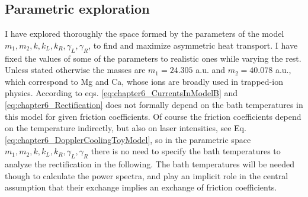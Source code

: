\subsection{Parametric exploration}
%
%
%
I have explored thoroughly the space formed by the parameters of the model $m_1,m_2,k,k_L,k_R,\gamma_L,\gamma_R$, to find
and maximize asymmetric heat transport. I have fixed the values of some of the parameters to realistic ones while varying the rest. Unless stated otherwise the masses are
$m_1 = 24.305$ a.u. and $m_2 = 40.078$ a.u., which correspond to Mg and Ca, whose ions are broadly used in trapped-ion physics. According to eqs. \eqref{eq:chapter6_CurrentsInModelB} and \eqref{eq:chapter6_Rectification} does not formally depend on the bath temperatures in this model for given friction coefficients. Of course the friction coefficients depend on the temperature indirectly, but also on laser intensities, see Eq. \eqref{eq:chapter6_DopplerCoolingToyModel}, so in the parametric space $m_1,m_2,k,k_L,k_R,\gamma_L,\gamma_R$ there is no need to specify the bath temperatures to analyze the rectification in the following. The bath temperatures will be needed though to calculate the power spectra, and play an implicit role in the central assumption that their exchange implies an exchange of friction coefficients.


